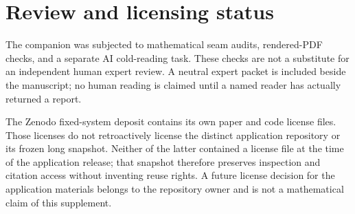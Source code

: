 \documentclass[11pt,reqno]{amsart}
\begin{document}
\section{Review and licensing status}

The companion was subjected to mathematical seam audits, rendered-PDF checks,
and a separate AI cold-reading task.  These checks are not a substitute
for an independent human expert review.  A neutral expert packet is included
beside the manuscript; no human reading is claimed until a named reader has
actually returned a report.

The Zenodo fixed-system deposit contains its own paper and code license files.
Those licenses do not retroactively license the distinct application
repository or its frozen long snapshot.  Neither of the latter contained a
license file at the time of the application release; that snapshot therefore
preserves inspection and citation access without inventing reuse rights.  A
future license decision for the application materials belongs to the
repository owner and is not a mathematical claim of this supplement.
\end{document}
